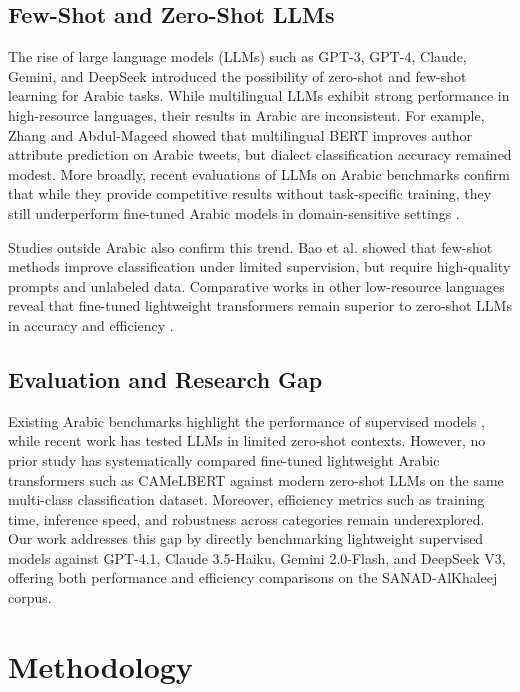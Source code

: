 \documentclass[sn-mathphys-num]{sn-jnl}
\begin{document}
\subsection{Few-Shot and Zero-Shot LLMs}
The rise of large language models (LLMs) such as GPT-3, GPT-4, Claude, Gemini, and DeepSeek introduced the possibility of zero-shot and few-shot learning for Arabic tasks. While multilingual LLMs exhibit strong performance in high-resource languages, their results in Arabic are inconsistent. For example, Zhang and Abdul-Mageed \cite{zhang2019bert} showed that multilingual BERT improves author attribute prediction on Arabic tweets, but dialect classification accuracy remained modest. More broadly, recent evaluations of LLMs on Arabic benchmarks confirm that while they provide competitive results without task-specific training, they still underperform fine-tuned Arabic models in domain-sensitive settings \cite{baniata2023transformer,hossain2024transnet}.

Studies outside Arabic also confirm this trend. Bao et al. \cite{bao2019few} showed that few-shot methods improve classification under limited supervision, but require high-quality prompts and unlabeled data. Comparative works in other low-resource languages reveal that fine-tuned lightweight transformers remain superior to zero-shot LLMs in accuracy and efficiency \cite{ali2022deep}.

\sloppy
\subsection{Evaluation and Research Gap}
Existing Arabic benchmarks highlight the performance of supervised models \cite{nassif2022arabic, elgendy2024toxicity}, while recent work has tested LLMs in limited zero-shot contexts. However, no prior study has systematically compared fine-tuned lightweight Arabic transformers such as CAMeLBERT against modern zero-shot LLMs on the same multi-class classification dataset. Moreover, efficiency metrics such as training time, inference speed, and robustness across categories remain underexplored. Our work addresses this gap by directly benchmarking lightweight supervised models against GPT-4.1, Claude 3.5-Haiku, Gemini 2.0-Flash, and DeepSeek V3, offering both performance and efficiency comparisons on the SANAD-AlKhaleej corpus.

\section{Methodology}
\label{methodology}
\label{dataset}
\end{document}
